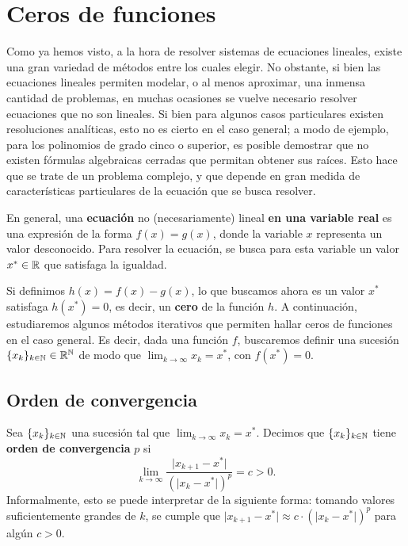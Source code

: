 
\section{Ceros de funciones}
\label{section:ceros-funciones}

Como ya hemos visto, a la hora de resolver sistemas de ecuaciones lineales,
existe una gran variedad de métodos entre los cuales elegir. No obstante, si
bien las ecuaciones lineales permiten modelar, o al menos aproximar, una
inmensa cantidad de problemas, en muchas ocasiones se vuelve necesario
resolver ecuaciones que no son lineales. Si bien para algunos casos
particulares existen resoluciones analíticas, esto no es cierto en el caso
general; a modo de ejemplo, para los polinomios de grado cinco o superior,
es posible demostrar que no existen fórmulas algebraicas cerradas que permitan
obtener sus raíces. Esto hace que se trate de un problema complejo, y que
depende en gran medida de características particulares de la ecuación que se
busca resolver.

En general, una \textbf{ecuación} no (necesariamente) lineal \textbf{en una
variable real} es una expresión de la forma $f(x) = g(x)$, donde la variable
$x$ representa un valor desconocido. Para resolver la ecuación, se busca
para esta variable un valor $x^\ast \in \mathbb{R}$ que satisfaga la igualdad.

Si definimos $h(x) = f(x) - g(x)$, lo que buscamos ahora es un valor $x^\ast$
satisfaga $h(x^\ast) = 0$, es decir, un \textbf{cero} de la función $h$.
A continuación, estudiaremos algunos métodos iterativos que permiten hallar
ceros de funciones en el caso general. Es decir, dada una función $f$,
buscaremos definir una sucesión
$\lbrace x_k \rbrace_{k \in \mathbb{N}} \in \mathbb{R}^{\mathbb{N}}$ de modo que
$\lim_{k \to \infty} x_k = x^\ast$, con $f(x^\ast) = 0$.

\subsection{Orden de convergencia}

Sea $\lbrace x_k \rbrace_{k \in \mathbb{N}}$ una sucesión tal que
$\lim_{k \to \infty} x_k = x^\ast$. Decimos que
$\lbrace x_k \rbrace_{k \in \mathbb{N}}$ tiene \textbf{orden de convergencia} $p$
si
\[ \lim_{k \to \infty} \frac{\lvert x_{k+1} - x^\ast \rvert}
    {\left( \lvert x_k - x^\ast \rvert \right)^p} = c > 0. \]
Informalmente, esto se puede interpretar de la siguiente forma: tomando
valores suficientemente grandes de $k$, se cumple que
$\lvert x_{k+1} - x^\ast \rvert \approx c \cdot \left(\lvert x_k - x^\ast \rvert\right)^p$
para algún $c > 0$.

